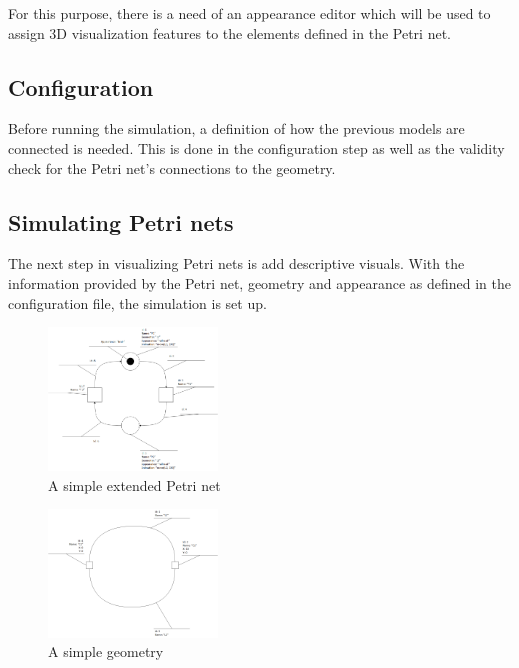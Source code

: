 For this purpose, there is a need of an appearance editor which will be used to assign 3D visualization features to the elements defined in the Petri net.

\subsection{Configuration}

Before running the simulation, a definition of how the previous models are connected is needed. This is done in the configuration step as well as the validity check for the Petri net's connections to the geometry. 

\subsection{Simulating Petri nets}
The next step in visualizing Petri nets is add descriptive visuals. With the information provided by the Petri net, geometry and appearance as defined in the configuration file, the simulation is set up.

\begin{figure}[htp]
\begin{center}
  \includegraphics[width=0.4\textwidth]{image/example_petrinet.png}
  \caption{A simple extended Petri net}
  \label{fig:example_petrinet}
\end{center}
\end{figure}

\begin{figure}[htp]
\begin{center}
  \includegraphics[width=0.4\textwidth]{image/example_petrinet_geometry.png}
  \caption{A simple geometry}
  \label{fig:example_petrinet_geometry}
\end{center}
\end{figure}

